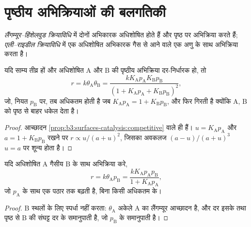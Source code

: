 \section{पृष्ठीय अभिक्रियाओं की बलगतिकी}

\begin{definition}[लैंगम्यूर--हिंशेलवुड और एली--राइडील क्रियाविधियाँ]\label{def:b3:surfaces-catalysis:mechanisms}
\emph{लैंगम्यूर--हिंशेलवुड क्रियाविधि} में
दोनों अभिकारक अधिशोषित होते हैं और पृष्ठ पर अभिक्रिया करते हैं;
\emph{एली--राइडील क्रियाविधि} में एक अधिशोषित अभिकारक
गैस से आने वाले एक अणु के साथ अभिक्रिया करता है।
\end{definition}

\begin{proposition}[लैंगम्यूर--हिंशेलवुड दर]\label{prop:b3:surfaces-catalysis:lh-rate}
यदि  साम्य तीव्र हों और अधिशोषित A और B की पृष्ठीय अभिक्रिया
दर-निर्धारक हो, तो
\[
  r = k\theta_{\mathrm A}\theta_{\mathrm B} = \frac{kK_{\mathrm A}p_{\mathrm A}K_{\mathrm B}p_{\mathrm B}}{(1 + K_{\mathrm A}p_{\mathrm A} + K_{\mathrm B}p_{\mathrm B})^2},
\]
जो, नियत $p_{\mathrm B}$ पर, तब अधिकतम होती है जब $K_{\mathrm A}p_{\mathrm A} = 1 + K_{\mathrm B}p_{\mathrm B}$, और फिर गिरती है क्योंकि A, B को
पृष्ठ से बाहर धकेल देता है।
\end{proposition}

\begin{proof}
आच्छादन \cref{prop:b3:surfaces-catalysis:competitive} वाले ही हैं। $u =
K_{\mathrm A}p_{\mathrm A}$ और $a = 1 + K_{\mathrm B}p_{\mathrm B}$ रखने पर $r \propto u/(a + u)^2$, जिसका अवकलज $(a - u)/(a + u)^3$
$u = a$ पर शून्य होता है।
\end{proof}

\begin{proposition}[एली--राइडील दर]\label{prop:b3:surfaces-catalysis:er-rate}
यदि अधिशोषित A गैसीय B के साथ अभिक्रिया करे,
\[
  r = k\theta_{\mathrm A}p_{\mathrm B} = \frac{kK_{\mathrm A}p_{\mathrm A}p_{\mathrm B}}{1 + K_{\mathrm A}p_{\mathrm A}},
\]
जो $p_{\mathrm A}$ के साथ एक पठार तक बढ़ती है, बिना किसी अधिकतम के।
\end{proposition}

\begin{proof}
B स्थलों के लिए स्पर्धा नहीं करता: $\theta_{\mathrm A}$ अकेले A का लैंगम्यूर आच्छादन है, और
दर इसके तथा पृष्ठ से B की संघट्ट दर के समानुपाती है, जो
$p_{\mathrm B}$ के समानुपाती है।
\end{proof}

